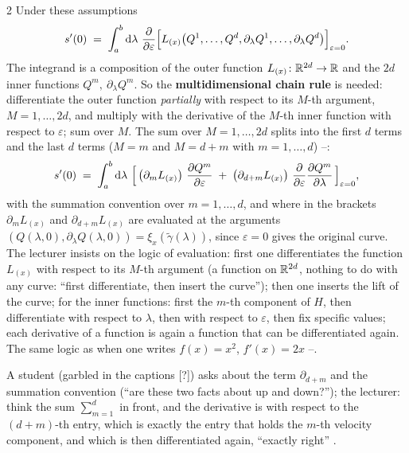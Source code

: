 \begin{paracol}{2}
Under these assumptions
\begin{equation}\label{eq:var-ds}
  s'(0)\;=\;\int_a^b\mathrm d\lambda\ \frac{\partial}{\partial\varepsilon}\Bigl[L_{(x)}\bigl(Q^1,\dots,Q^d,\partial_\lambda Q^1,\dots,\partial_\lambda Q^d\bigr)\Bigr]_{\varepsilon=0}.
\end{equation}
The integrand is a composition of the outer function $L_{(x)}\colon\mathbb{R}^{2d}\to\mathbb{R}$ and the $2d$ inner functions $Q^m,\ \partial_\lambda Q^m$. So the \textbf{multidimensional chain rule} is needed: differentiate the outer function \emph{partially} with respect to its $M$-th argument, $M=1,\dots,2d$, and multiply with the derivative of the $M$-th inner function with respect to $\varepsilon$; sum over $M$. The sum over $M=1,\dots,2d$ splits into the first $d$ terms and the last $d$ terms ($M=m$ and $M=d+m$ with $m=1,\dots,d$) --:
\begin{equation}\label{eq:var-chain}
  s'(0)\;=\;\int_a^b\mathrm d\lambda\ \Bigl[\,\bigl(\partial_mL_{(x)}\bigr)\ \frac{\partial Q^m}{\partial\varepsilon}\;+\;\bigl(\partial_{d+m}L_{(x)}\bigr)\ \frac{\partial}{\partial\varepsilon}\frac{\partial Q^m}{\partial\lambda}\,\Bigr]_{\varepsilon=0},
\end{equation}
with the summation convention over $m=1,\dots,d$, and where in the brackets $\partial_mL_{(x)}$ and $\partial_{d+m}L_{(x)}$ are evaluated at the arguments $(Q(\lambda,0),\partial_\lambda Q(\lambda,0))=\xi_x(\tilde\gamma(\lambda))$, since $\varepsilon=0$ gives the original curve. The lecturer insists on the logic of evaluation: first one differentiates the function $L_{(x)}$ with respect to its $M$-th argument (a function on $\mathbb{R}^{2d}$, nothing to do with any curve: ``first differentiate, then insert the curve''); then one inserts the lift of the curve; for the inner functions: first the $m$-th component of $H$, then differentiate with respect to $\lambda$, then with respect to $\varepsilon$, then fix specific values; each derivative of a function is again a function that can be differentiated again. The same logic as when one writes $f(x)=x^2$, $f'(x)=2x$ --.

\begin{coursenote}\label{cn:var-index}
A student (garbled in the captions [?]) asks about the term $\partial_{d+m}$ and the summation convention (``are these two facts about up and down?''); the lecturer: think the sum $\sum_{m=1}^d$ in front, and the derivative is with respect to the $(d+m)$-th entry, which is exactly the entry that holds the $m$-th velocity component, and which is then differentiated again, ``exactly right'' .
\end{coursenote}


\end{paracol}
